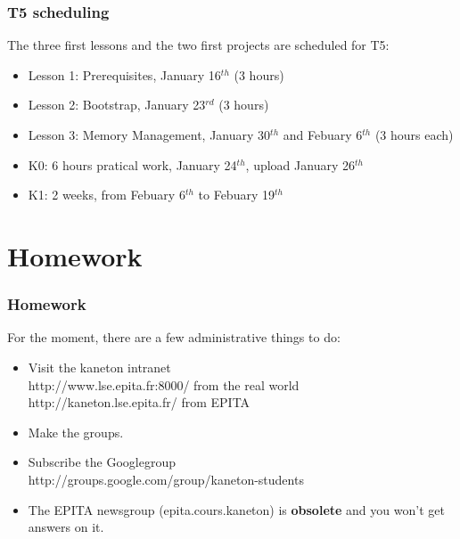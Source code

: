 {%

\begin{frame}
  \frametitle{T5 scheduling}

  The three first lessons and the two first projects are scheduled for
  T5:

  \begin{itemize}
  \item
    Lesson 1: Prerequisites, January 16$^{th}$ (3 hours)
  \item
    Lesson 2: Bootstrap, January 23$^{rd}$ (3 hours)
  \item
    Lesson 3: Memory Management, January 30$^{th}$ and Febuary 6$^{th}$ (3 hours each)
  \end{itemize}

  \begin{itemize}
  \item
    K0: 6 hours pratical work, January 24$^{th}$, upload January 26$^{th}$
  \item
    K1: 2 weeks, from Febuary 6$^{th}$ to Febuary 19$^{th}$
  \end{itemize}

\end{frame}

%
%

\section{Homework}


\begin{frame}
  \frametitle{Homework}

  For the moment, there are a few administrative things to do:

  \begin{itemize}
  \item
    Visit the kaneton intranet\\
    http://www.lse.epita.fr:8000/ from the real world\\
    http://kaneton.lse.epita.fr/ from EPITA
  \item
    Make the groups.
  \item
    Subscribe the Googlegroup\\
    http://groups.google.com/group/kaneton-students
  \item
    The EPITA newsgroup (epita.cours.kaneton) is \textbf{obsolete} and
    you won't get answers on it.
  \end{itemize}


\end{frame}}
